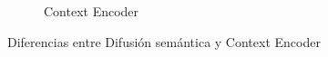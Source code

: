 \begin{figure}[H]
\begin{subfigure}{.35\linewidth}
        \caption{Context Encoder}
        \label{subfig:context-encoder}
    \end{subfigure}

    \caption{Diferencias entre Difusión semántica y Context Encoder}
    \label{fig:context-encoder-vs-semantic-diffuson}
\end{figure}



